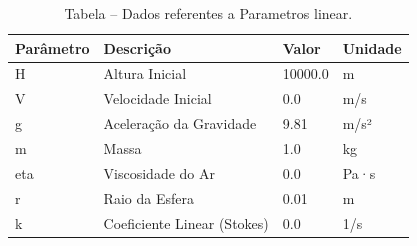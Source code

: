 \begin{table}[H]
\centering
\caption{Tabela – Dados referentes a Parametros linear.}
\label{tab:parametros_linear}
\begin{tabular}{llll}
\toprule
Parâmetro & Descrição & Valor & Unidade \\
\midrule
H & Altura Inicial & 10000.0 & m \\
V & Velocidade Inicial & 0.0 & m/s \\
g & Aceleração da Gravidade & 9.81 & m/s² \\
m & Massa & 1.0 & kg \\
eta & Viscosidade do Ar & 0.0 & Pa·s \\
r & Raio da Esfera & 0.01 & m \\
k & Coeficiente Linear (Stokes) & 0.0 & 1/s \\
\bottomrule
\end{tabular}

\end{table}
